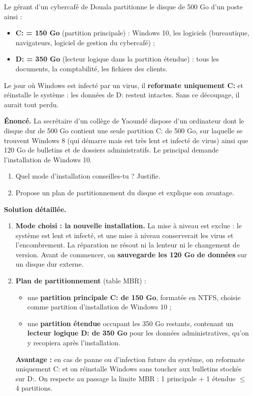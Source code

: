 \documentclass[11pt]{article}
\begin{document}
\begin{exemplebox}
Le gérant d'un cybercafé de Douala partitionne le disque de 500 Go d'un poste ainsi :
\begin{itemize}
\item \textbf{C: = 150 Go} (partition principale) : Windows 10, les logiciels (bureautique, navigateurs, logiciel de gestion du cybercafé) ;
\item \textbf{D: = 350 Go} (lecteur logique dans la partition étendue) : tous les documents, la comptabilité, les fichiers des clients.
\end{itemize}
Le jour où Windows est infecté par un virus, il \textbf{reformate uniquement C:} et réinstalle le système : les données de D: restent intactes. Sans ce découpage, il aurait tout perdu.
\end{exemplebox}

\begin{exoresolu}
\textbf{Énoncé.} La secrétaire d'un collège de Yaoundé dispose d'un ordinateur dont le disque dur de 500 Go contient une seule partition C: de 500 Go, sur laquelle se trouvent Windows 8 (qui démarre mais est très lent et infecté de virus) ainsi que 120 Go de bulletins et de dossiers administratifs. Le principal demande l'installation de Windows 10.
\begin{enumerate}
\item Quel mode d'installation conseilles-tu ? Justifie.
\item Propose un plan de partitionnement du disque et explique son avantage.
\end{enumerate}
\tcblower
\textbf{Solution détaillée.}
\begin{enumerate}
\item \textbf{Mode choisi : la nouvelle installation.} La mise à niveau est exclue : le système est lent et infecté, et une mise à niveau conserverait les virus et l'encombrement. La réparation ne résout ni la lenteur ni le changement de version. Avant de commencer, on \textbf{sauvegarde les 120 Go de données} sur un disque dur externe.
\item \textbf{Plan de partitionnement} (table MBR) :
\begin{itemize}
\item une \textbf{partition principale C: de 150 Go}, formatée en NTFS, choisie comme partition d'installation de Windows 10 ;
\item une \textbf{partition étendue} occupant les 350 Go restants, contenant un \textbf{lecteur logique D: de 350 Go} pour les données administratives, qu'on y recopiera après l'installation.
\end{itemize}
\textbf{Avantage :} en cas de panne ou d'infection future du système, on reformate uniquement C: et on réinstalle Windows sans toucher aux bulletins stockés sur D:. On respecte au passage la limite MBR : 1 principale + 1 étendue $\leq$ 4 partitions.
\end{enumerate}
\end{exoresolu}
\end{document}
